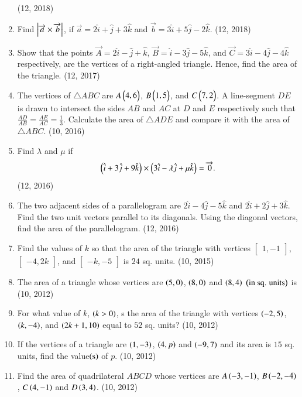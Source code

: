 \begin{enumerate}[label=\thesubsection.\arabic*,ref=\thesubsection.\theenumi]
\hfill (12, 2018) 
\item Find $\left\vert\overrightarrow{a} \times \overrightarrow{b}\right\vert$, if $\overrightarrow{a}=2\hat{i}+\hat{j}+3\hat{k}$ and $\overrightarrow{b}=3\hat{i}+5\hat{j}-2\hat{k}$.
\hfill (12, 2018) 
    \item Show that the points $\vec{A} = 2\hat{i} - \hat{j} + \hat{k}$, $\vec{B} = \hat{i} - 3\hat{j} - 5\hat{k}$, and $\vec{C} = 3\hat{i} - 4\hat{j} - 4\hat{k}$ respectively, are the vertices of a right-angled triangle. Hence, find the area of the triangle. \hfill (12, 2017)
    \item The vertices of $\triangle ABC$ are $A \begin{pmatrix}4, 6\end{pmatrix}$, $B \begin{pmatrix}1, 5\end{pmatrix}$, and $C \begin{pmatrix}7, 2\end{pmatrix}$. A line-segment $DE$ is drawn to intersect the sides $AB$ and $AC$ at $D$ and $E$ respectively such that $\frac{AD}{AB} = \frac{AE}{AC} = \frac{1}{3}$. Calculate the area of $\triangle ADE$ and compare it with the area of $\triangle ABC$. \hfill (10, 2016)
\item Find $\lambda$ and $\mu$ if
      \begin{align*}
          \begin{pmatrix}\hat{i} + 3\hat{j} + 9\hat{k}\end{pmatrix} \times \begin{pmatrix}3\hat{i} - \lambda \hat{j} + \mu \hat{k}\end{pmatrix} = \overrightarrow{0}.
      \end{align*}
      \hfill (12, 2016)
\item The two adjacent sides of a parallelogram are $2\hat{i}-4\hat{j}-5\hat{k}$ and $2\hat{i}+2\hat{j}+3\hat{k}$. Find the two unit vectors parallel to its diagonals. Using the diagonal vectors, find the area of the parallelogram. \hfill (12, 2016)
\item Find the values of $k$ so that the area of the triangle with vertices $\begin{bmatrix}1, -1\end{bmatrix}$, $\begin{bmatrix}-4, 2k\end{bmatrix}$, and $\begin{bmatrix}-k, -5\end{bmatrix}$ is $24$ sq. units. \hfill (10, 2015)
\item The area of a triangle whose vertices are $\left(5,0\right)$, $\left(8,0\right)$ and $\left(8,4\right)$ $\left(\text{in sq. units}\right)$ is
\hfill (10, 2012)
\item For what value of $k$, $\left( k > 0\right)$, s the area of the triangle with vertices $\left(-2,5\right)$, $\left(k,-4\right)$, and $\left(2k+1,10\right)$ equal to $52$ sq. units? 
\hfill (10, 2012)

\item If the vertices of a triangle are $\left(1,-3\right)$, $\left(4,p\right)$ and $\left(-9,7\right)$ and its area is $15$ sq. units, find the value$\left(\text{s}\right)$ of $p$. 
\hfill (10, 2012)

\item Find the area of quadrilateral $ABCD$ whose vertices are $A\left(-3,-1\right)$, $B\left(-2,-4\right)$, $C\left(4,-1\right)$ and $D\left(3,4\right)$.
\hfill (10, 2012)

\end{enumerate}
